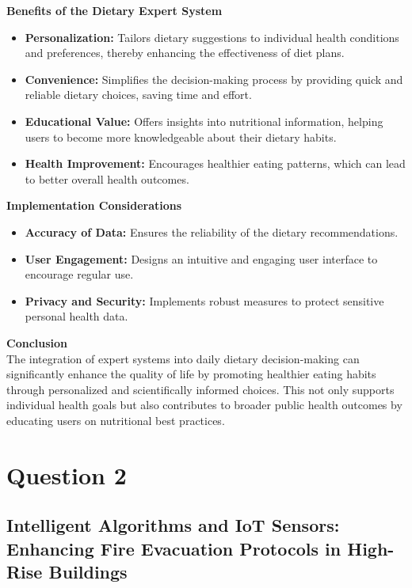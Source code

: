 \documentclass[12pt,a4paper]{article}
\begin{document}
\noindent \textbf{Benefits of the Dietary Expert System }
\begin{itemize}
    \item \textbf{Personalization:} Tailors dietary suggestions to individual health conditions and preferences, thereby enhancing the effectiveness of diet plans.
    \item \textbf{Convenience:} Simplifies the decision-making process by providing quick and reliable dietary choices, saving time and effort.
    \item \textbf{Educational Value:} Offers insights into nutritional information, helping users to become more knowledgeable about their dietary habits.
    \item \textbf{Health Improvement:} Encourages healthier eating patterns, which can lead to better overall health outcomes.
\end{itemize}
\noindent \textbf{Implementation Considerations}
\begin{itemize}
    \item \textbf{Accuracy of Data:} Ensures the reliability of the dietary recommendations.
    \item \textbf{User Engagement:} Designs an intuitive and engaging user interface to encourage regular use.
    \item \textbf{Privacy and Security:} Implements robust measures to protect sensitive personal health data.
\end{itemize}

\noindent \textbf{Conclusion}\\
The integration of expert systems into daily dietary decision-making can significantly enhance the quality of life by promoting healthier eating habits through personalized and scientifically informed choices. This not only supports individual health goals but also contributes to broader public health outcomes by educating users on nutritional best practices. \\



\pagebreak %



\setcounter{page}{3}

\section{Question 2}
\subsection{Intelligent Algorithms and IoT Sensors: Enhancing Fire Evacuation Protocols in High-Rise Buildings}
\label{sec:Question 2}
\end{document}
